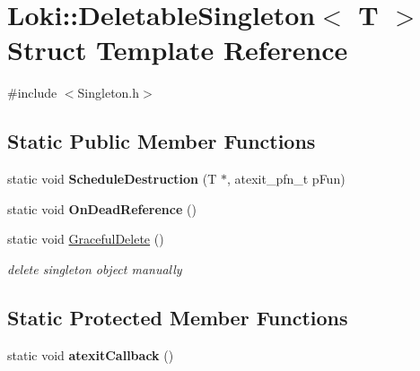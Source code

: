\hypertarget{classLoki_1_1DeletableSingleton}{}\section{Loki\+:\+:Deletable\+Singleton$<$ T $>$ Struct Template Reference}
\label{classLoki_1_1DeletableSingleton}


{\ttfamily \#include $<$Singleton.\+h$>$}

\subsection*{Static Public Member Functions}
\begin{DoxyCompactItemize}
\item 
\hypertarget{classLoki_1_1DeletableSingleton_acdb434705832a8dec514cf4a56954cf0}{}static void {\bfseries Schedule\+Destruction} (T $\ast$, atexit\+\_\+pfn\+\_\+t p\+Fun)\label{classLoki_1_1DeletableSingleton_acdb434705832a8dec514cf4a56954cf0}

\item 
\hypertarget{classLoki_1_1DeletableSingleton_ac18984dfcb610ee1979cee691e163d9f}{}static void {\bfseries On\+Dead\+Reference} ()\label{classLoki_1_1DeletableSingleton_ac18984dfcb610ee1979cee691e163d9f}

\item 
\hypertarget{classLoki_1_1DeletableSingleton_a626c2dc57146f1aea6bf911682f8e3e9}{}static void \hyperlink{classLoki_1_1DeletableSingleton_a626c2dc57146f1aea6bf911682f8e3e9}{Graceful\+Delete} ()\label{classLoki_1_1DeletableSingleton_a626c2dc57146f1aea6bf911682f8e3e9}

\begin{DoxyCompactList}\small\item\em delete singleton object manually \end{DoxyCompactList}\end{DoxyCompactItemize}
\subsection*{Static Protected Member Functions}
\begin{DoxyCompactItemize}
\item 
\hypertarget{classLoki_1_1DeletableSingleton_ad6a37ac24c1f199967c4908ffdd6f729}{}static void {\bfseries atexit\+Callback} ()\label{classLoki_1_1DeletableSingleton_ad6a37ac24c1f199967c4908ffdd6f729}

\end{DoxyCompactItemize}
